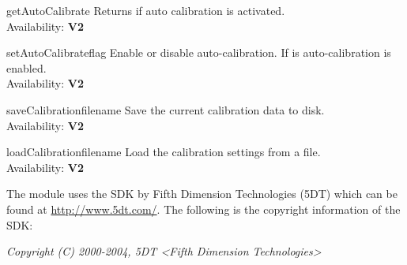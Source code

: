 \begin{methoddesc}{getAutoCalibrate}{}
Returns  if auto calibration is activated.\\
Availability: {\bf V2}
\end{methoddesc}

\begin{methoddesc}{setAutoCalibrate}{flag}
Enable or disable auto-calibration. If  is  
auto-calibration is enabled.\\
Availability: {\bf V2}
\end{methoddesc}

\begin{methoddesc}{saveCalibration}{filename}
Save the current calibration data to disk.\\
Availability: {\bf V2}
\end{methoddesc}

\begin{methoddesc}{loadCalibration}{filename}
Load the calibration settings from a file.\\
Availability: {\bf V2}
\end{methoddesc}



\begin{notice}[note]
The module uses the SDK by Fifth Dimension Technologies (5DT) which
can be found at \url{http://www.5dt.com/}. The following is
the copyright information of the SDK:

{\em Copyright (C) 2000-2004, 5DT <Fifth Dimension Technologies>}
\end{notice}

